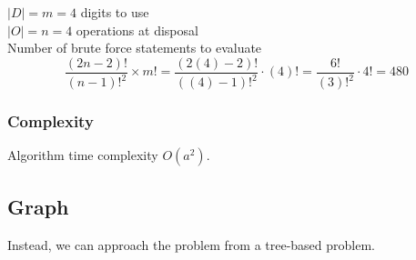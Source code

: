 \documentclass[12pt,a4paper]{article}
\begin{document}
\noindent $|D| = m = 4$ digits to use\\
$|O| = n = 4$ operations at disposal\\

\noindent Number of brute force statements to evaluate $$\dfrac{(2n-2)!}{(n-1)!^2} \times m! = \dfrac{(2(4)-2)!}{((4)-1)!^2} \cdot (4)! = \dfrac{6!}{(3)!^2} \cdot 4! = 480$$

\subsubsection*{Complexity}

Algorithm time complexity $O(a^2)$. 

\pagebreak

\subsection*{Graph}

Instead, we can approach the problem from a tree-based problem.\\
\end{document}
